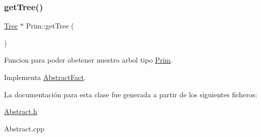 \mbox{\label{classPrim_aeccbb4f2821f8bc508647e2f6dd95370}} 
\subsubsection{\texorpdfstring{get\+Tree()}{getTree()}}
{\footnotesize\ttfamily \hyperlink{classTree}{Tree} $\ast$ Prim\+::get\+Tree (\begin{DoxyParamCaption}{ }\end{DoxyParamCaption})\hspace{0.3cm}{\ttfamily [virtual]}}

Funcion para poder obetener nuestro arbol tipo \hyperlink{classPrim}{Prim}. 

Implementa \hyperlink{classAbstractFact_a37e763c0a454db79c61f229d33b72c73}{Abstract\+Fact}.



La documentación para esta clase fue generada a partir de los siguientes ficheros\+:\begin{DoxyCompactItemize}
\item 
\hyperlink{Abstract_8h}{Abstract.\+h}\item 
Abstract.\+cpp\end{DoxyCompactItemize}

